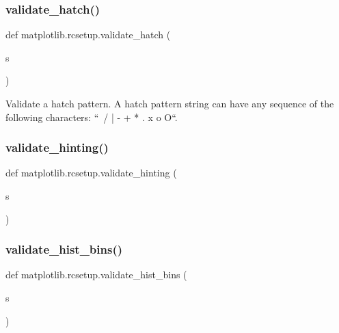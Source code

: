 \mbox{\label{namespacematplotlib_1_1rcsetup_a1655f90b2a492a2e6a773e4221a01f7b}} 
\subsubsection{\texorpdfstring{validate\+\_\+hatch()}{validate\_hatch()}}
{\footnotesize\ttfamily def matplotlib.\+rcsetup.\+validate\+\_\+hatch (\begin{DoxyParamCaption}\item[{}]{s }\end{DoxyParamCaption})}

\begin{DoxyVerb}Validate a hatch pattern.
A hatch pattern string can have any sequence of the following
characters: ``\ / | - + * . x o O``.
\end{DoxyVerb}
 \mbox{\label{namespacematplotlib_1_1rcsetup_a819dbbc11ae17186dc06f6e9d7f2d9fe}} 
\subsubsection{\texorpdfstring{validate\+\_\+hinting()}{validate\_hinting()}}
{\footnotesize\ttfamily def matplotlib.\+rcsetup.\+validate\+\_\+hinting (\begin{DoxyParamCaption}\item[{}]{s }\end{DoxyParamCaption})}

\mbox{\label{namespacematplotlib_1_1rcsetup_a9eda8d058765b27c817a645006a34fa4}} 
\subsubsection{\texorpdfstring{validate\+\_\+hist\+\_\+bins()}{validate\_hist\_bins()}}
{\footnotesize\ttfamily def matplotlib.\+rcsetup.\+validate\+\_\+hist\+\_\+bins (\begin{DoxyParamCaption}\item[{}]{s }\end{DoxyParamCaption})}

